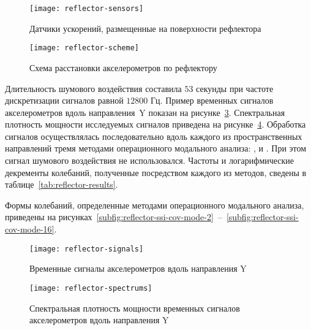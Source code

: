 \begin{figure}[!htb]
	\centerfloat
	\texttt{[image: reflector-sensors]}
	\caption{Датчики ускорений, размещенные на поверхности рефлектора} \label{fig:reflector-sensors}
\end{figure}

\begin{figure}[!htb]
	\centerfloat
	\texttt{[image: reflector-scheme]}
	\caption{Схема расстановки акселерометров по рефлектору} \label{fig:reflector-scheme}
\end{figure}

Длительность шумового воздействия составила $ 53 $ секунды при частоте дискретизации сигналов равной $ 12800 $ Гц. Пример временных сигналов акселерометров вдоль направления~$ \mathrm{Y} $ показан на рисунке~\ref{fig:reflector-signals}. Спектральная плотность мощности исследуемых сигналов приведена на рисунке~\ref{fig:reflector-spectrums}. Обработка сигналов осуществлялась последовательно вдоль каждого из пространственных направлений тремя методами операционного модального анализа: ,  и . При этом сигнал шумового воздействия не использовался. Частоты и логарифмические декременты колебаний, полученные посредством каждого из методов, сведены в таблице~\ref{tab:reflector-results}.

Формы колебаний, определенные методами операционного модального анализа, приведены на рисунках~\ref{subfig:reflector-ssi-cov-mode-2}~--~\ref{subfig:reflector-ssi-cov-mode-16}.

\begin{figure}[!htb]
	\centerfloat
	\texttt{[image: reflector-signals]}
	\caption{Временные сигналы акселерометров вдоль направления $ \mathrm{Y} $} \label{fig:reflector-signals}
\end{figure}

\begin{figure}[!htb]
	\centerfloat
	\texttt{[image: reflector-spectrums]}
	\caption{Спектральная плотность мощности временных сигналов акселерометров вдоль направления $ \mathrm{Y} $} \label{fig:reflector-spectrums}
\end{figure}

